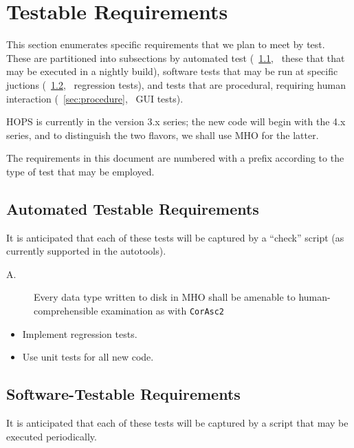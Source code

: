 %
%
\section{Testable Requirements}
\label{sec:testable}

This section enumerates specific requirements that we plan to meet by test.
These are partitioned into subsections by automated test
(\Sec~\ref{sec:auto}, \ie~these that that may be executed
in a nightly build), software tests that may be run at specific
juctions (\Sec~\ref{sec:regress}, \ie~regression tests),
and tests that are procedural, requiring human interaction
(\Sec~\ref{sec:procedure}, \ie~\ac{GUI} tests).%

\ac{HOPS} is currently in the version 3.x series; the new code will
begin with the 4.x series, and to distinguish the two flavors, we
shall use \ac{MHO} for the latter.

The requirements in this document are numbered with a prefix
according to the type of test that may be employed.

\subsection{Automated Testable Requirements}
\label{sec:auto}

It is anticipated that each of these tests will be captured by a
``check'' script (as currently supported in the autotools).

\begin{description}
\item[A.\thereq] Every data type written to disk in \ac{MHO} shall be 
amenable to human-comprehensible examination as with \texttt{\ac{CorAsc2}}
\end{description}
\begin{itemize}
\item Implement regression tests.
\item Use unit tests for all new code.
\end{itemize}

\subsection{Software-Testable Requirements}
\label{sec:regress}

It is anticipated that each of these tests will be captured by a
script that may be executed periodically.

